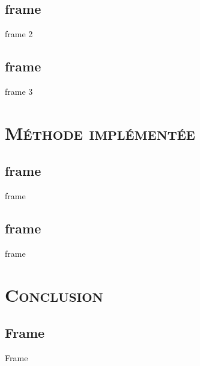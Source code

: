 \documentclass[xcolor=x11names,compress]{beamer}
\renewcommand{\(}{\begin{columns}}
\renewcommand{\)}{\end{columns}}
\newcommand{\<}[1]{\begin{column}{#1}}
\renewcommand{\>}{\end{column}}
\begin{document}
\subsection{frame}
\begin{frame}{frame 2}

\end{frame}

\subsection{frame}
\begin{frame}{frame 3}

\end{frame}


\section{\scshape Méthode implémentée}
\subsection{frame}
\begin{frame}{frame}

\end{frame}


\subsection{frame}
\begin{frame}{frame}

\end{frame}

\section{\scshape Conclusion}
\subsection{Frame}
\begin{frame}{Frame}

\end{frame}
\end{document}

